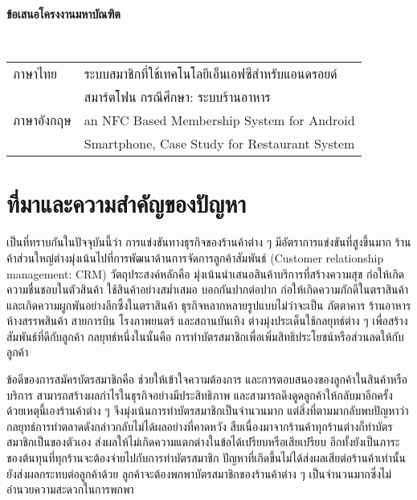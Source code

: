 \documentclass[12pt,a4paper]{article}
\begin{document}
\clearpage

\begin{center}
{\huge \bf ข้อเสนอโครงงานมหาบัณฑิต}
\end{center}

 \\

\Large{\noindent\hspace{0.7cm}\setlength{\tabcolsep}{15pt}
\begin{tabular}{l l}    
	ภาษาไทย 		& ระบบสมาชิกที่ใช้เทคโนโลยีเอ็นเอฟซีสำหรับแอนดรอยด์  \\
					& สมาร์ตโฟน กรณีศึกษา: ระบบร้านอาหาร \\
	ภาษาอังกฤษ		& an NFC Based Membership System for Android \\
					& Smartphone, Case Study for Restaurant System \\    
\end{tabular}
}

\section{ที่มาและความสำคัญของปัญหา}

เป็นที่ทราบกันในปัจจุบันนี้ว่า การแข่งขันทางธุรกิจของร้านค้าต่าง ๆ มีอัตราการแข่งขันที่สูงขึ้นมาก ร้านค้าส่วนใหญ่ต่างมุ่งเน้นไปที่การพัฒนาด้านการจัดการลูกค้าสัมพันธ์ (Customer relationship management: CRM) วัตถุประสงค์หลักคือ มุ่งเน้นนำเสนอสินค้าบริการที่สร้างความสุข ก่อให้เกิดความชื่นชอบในตัวสินค้า ใช้สินค้าอย่างสม่ำเสมอ บอกกันปากต่อปาก ก่อให้เกิดความภักดีในตราสินค้า และเกิดความผูกพันอย่างลึกซึ้งในตราสินค้า ธุรกิจหลากหลายรูปแบบไม่ว่าจะเป็น ภัตตาคาร ร้านอาหาร ห้างสรรพสินค้า สายการบิน โรงภาพยนตร์ และสถานบันเทิง ต่างมุ่งประเด็นใช้กลยุทธ์ต่าง ๆ เพื่อสร้างสัมพันธ์ที่ดีกับลูกค้า กลยุทธ์หนึ่งในนั้นคือ การทำบัตรสมาชิกเพื่อเพิ่มสิทธิประโยชน์หรือส่วนลดให้กับลูกค้า

ข้อดีของการสมัครบัตรสมาชิกคือ ช่วยให้เข้าใจความต้องการ และการตอบสนองของลูกค้าในสินค้าหรือบริการ สามารถสร้างผลกําไรในธุรกิจอย่างมีประสิทธิภาพ และสามารถดึงดูดลูกค้าให้กลับมาอีกครั้ง ด้วยเหตุนี้เองร้านค้าต่าง ๆ จึงมุ่งเน้นการทำบัตรสมาชิกเป็นจำนวนมาก แต่สิ่งที่ตามมากลับพบปัญหาว่ากลยุทธ์การทำตลาดดังกล่าวกลับไม่ได้ผลอย่างที่คาดหวัง สืบเนื่องมาจากร้านค้าทุกร้านต่างก็ทำบัตรสมาชิกเป็นของตัวเอง ส่งผลให้ไม่เกิดความแตกต่างในข้อได้เปรียบหรือเสียเปรียบ อีกทั้งยังเป็นภาระของต้นทุนที่ทุกร้านจะต้องจ่ายไปกับการทำบัตรสมาชิก ปัญหาที่เกิดขึ้นไม่ได้ส่งผลเสียต่อร้านค้าเท่านั้น  ยังส่งผลกระทบต่อลูกค้าด้วย ลูกค้าจะต้องพกพาบัตรสมาชิกของร้านค้าต่าง ๆ เป็นจำนวนมากซึ่งไม่อำนวยความสะดวกในการพกพา
\end{document}
